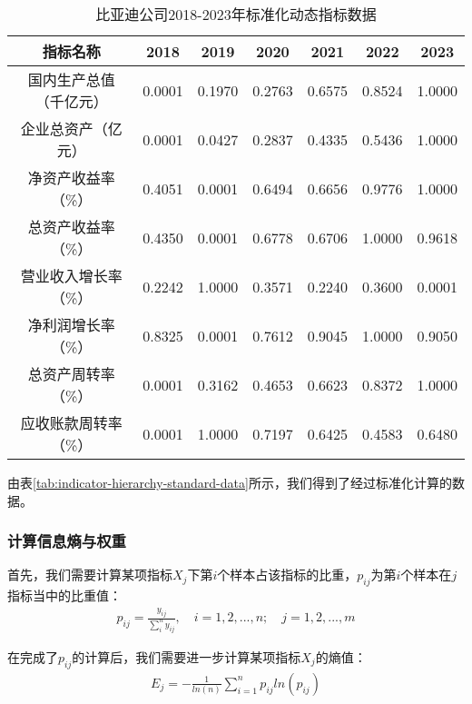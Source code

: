 \begin{table}
  \centering
  \begin{threeparttable}[c]
    \caption{比亚迪公司2018-2023年标准化动态指标数据}
    \label{tab:indicator-hierarchy-standard-data}
    \begin{tabular}{ccccccc}
      \toprule
        指标名称 & 2018 & 2019 & 2020 & 2021 & 2022 & 2023 \\ 
      \midrule
        国内生产总值（千亿元） & 0.0001  & 0.1970  & 0.2763  & 0.6575  & 0.8524  & 1.0000  \\ 
        企业总资产（亿元） & 0.0001  & 0.0427  & 0.2837  & 0.4335  & 0.5436  & 1.0000  \\ 
        净资产收益率（\%） & 0.4051  & 0.0001  & 0.6494  & 0.6656  & 0.9776  & 1.0000  \\ 
        总资产收益率（\%） & 0.4350  & 0.0001  & 0.6778  & 0.6706  & 1.0000  & 0.9618  \\ 
        营业收入增长率（\%） & 0.2242  & 1.0000  & 0.3571  & 0.2240  & 0.3600  & 0.0001  \\ 
        净利润增长率（\%） & 0.8325  & 0.0001  & 0.7612  & 0.9045  & 1.0000  & 0.9050  \\ 
        总资产周转率（\%） & 0.0001  & 0.3162  & 0.4653  & 0.6623  & 0.8372  & 1.0000  \\ 
        应收账款周转率（\%） & 0.0001  & 1.0000  & 0.7197  & 0.6425  & 0.4583  & 0.6480 \\ 
      \bottomrule
    \end{tabular}
  \end{threeparttable}
\end{table}

由表\eqref{tab:indicator-hierarchy-standard-data}所示，我们得到了经过标准化计算的数据。

\subsubsection{计算信息熵与权重}
首先，我们需要计算某项指标$X_j$下第$i$个样本占该指标的比重，$p_{ij}$为第$i$个样本在$j$指标当中的比重值：
\begin{equation}
\begin{aligned}
p_{ij}=\frac{y_{ij}}{\sum_i^n y_{ij} } ,\quad i=1,2,...,n;\quad j=1,2,...,m
  \label{eq:pij}
\end{aligned}
\end{equation}

在完成了$p_{ij}$的计算后，我们需要进一步计算某项指标$X_j$的熵值：
\begin{equation}
\begin{aligned}
E_j=-\frac{1}{ln(n)}\sum_{i=1}^np_{ij}ln(p_{ij})
  \label{eq:ej}
\end{aligned}
\end{equation}

